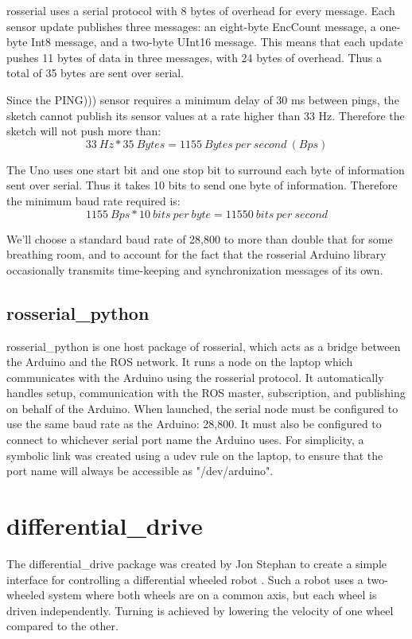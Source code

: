 rosserial uses a serial protocol with 8 bytes of overhead for every message. Each sensor update publishes three messages: an eight-byte EncCount message, a one-byte Int8 message, and a two-byte UInt16 message. This means that each update pushes 11 bytes of data in three messages, with 24 bytes of overhead. Thus a total of 35 bytes are sent over serial.

Since the PING))) sensor requires a minimum delay of 30 ms between pings, the sketch cannot publish its sensor values at a rate higher than 33 Hz. Therefore the sketch will not push more than:
\[33\ Hz * 35\ Bytes = 1155\ Bytes\ per\ second\ (Bps)\]

The Uno uses one start bit and one stop bit to surround each byte of information sent over serial. Thus it takes 10 bits to send one byte of information. Therefore the minimum baud rate required is:
\[1155\ Bps * 10\ bits\ per\ byte = 11550\ bits\ per\ second\]

We'll choose a standard baud rate of 28,800 to more than double that for some breathing room, and to account for the fact that the rosserial Arduino library occasionally transmits time-keeping and synchronization messages of its own.

\subsection{rosserial\_python}
rosserial\_python is one host package of rosserial, which acts as a bridge between the Arduino and the ROS network. It runs a node on the laptop which communicates with the Arduino using the rosserial protocol. It automatically handles setup, communication with the ROS master, subscription, and publishing on behalf of the Arduino. When launched, the serial node must be configured to use the same baud rate as the Arduino: 28,800. It must also be configured to connect to whichever serial port name the Arduino uses. For simplicity, a symbolic link was created using a udev rule on the laptop, to ensure that the port name will always be accessible as "/dev/arduino". %

\section{differential\_drive}
The differential\_drive package was created by Jon Stephan to create a simple interface for controlling a differential wheeled robot \cite{}. Such a robot uses a two-wheeled system where both wheels are on a common axis, but each wheel is driven independently. Turning is achieved by lowering the velocity of one wheel compared to the other.

